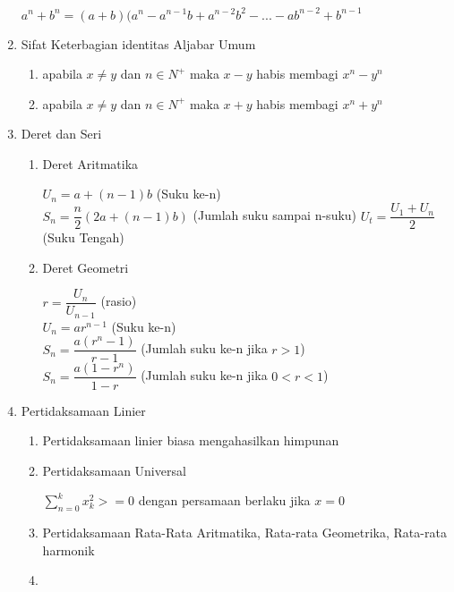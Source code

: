 \documentclass[12pt,a4paper,draft,final,oneside,twoside,openright,openany]{article}
\begin{document}
\begin{enumerate}
\begin{center}
				$a^n+b^n=(a+b)(a^n-a^{n-1}b+a^{n-2}b^{2}-...-ab^{n-2}+b^{n-1}$
			\end{center}
			\item Sifat Keterbagian identitas Aljabar Umum
			\begin{enumerate}
				\item apabila $x\neq y$ dan $n\in N^+$ maka $x-y$ habis membagi $x^n-y^n$
				\item apabila $x\neq y$ dan $n\in N^+$ maka $x+y$ habis membagi $x^n+y^n$
			\end{enumerate}
			\item Deret dan Seri
			\begin{enumerate}
				\item Deret Aritmatika
					\begin{center}
						$U_n=a+(n-1)b$ (Suku ke-n)\\
						$S_n=\dfrac{n}{2}(2a+(n-1)b)$ (Jumlah suku sampai n-suku)
						$U_t=\dfrac{U_1+U_n}{2}$ (Suku Tengah)
					\end{center}
				\item Deret Geometri
					\begin{center}
						$r=\dfrac{U_{n}}{U_{n-1}}$ (rasio)\\
						$U_n=ar^{n-1}$ (Suku ke-n)\\
						$S_n=\dfrac{a(r^n-1)}{r-1}$ (Jumlah suku ke-n jika $r>1$)\\
						$S_n=\dfrac{a(1-r^n)}{1-r}$ (Jumlah suku ke-n jika $0<r<1$)
					\end{center}
			\end{enumerate}
			\item Pertidaksamaan Linier
				\begin{enumerate}
					\item Pertidaksamaan linier biasa mengahasilkan himpunan
					\item Pertidaksamaan Universal
					\begin{center}
						$\sum_{n=0}^{k} x^2_k>=0$ dengan persamaan berlaku jika $x=0$
					\end{center}
					\item Pertidaksamaan Rata-Rata Aritmatika, Rata-rata Geometrika, Rata-rata harmonik
					\item 
				\end{enumerate}
			
\noindent\makebox[\linewidth]{\rule{\paperwidth}{0.4pt}}
		
		\end{enumerate}
\end{document}
